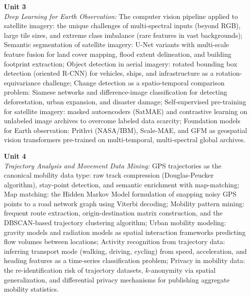 \vspace{0.3cm}

\noindent\textbf{Unit 3} \\
\textit{Deep Learning for Earth Observation:} The computer vision pipeline applied to satellite imagery: the unique challenges of multi-spectral inputs (beyond RGB), large tile sizes, and extreme class imbalance (rare features in vast backgrounds); Semantic segmentation of satellite imagery: U-Net variants with multi-scale feature fusion for land cover mapping, flood extent delineation, and building footprint extraction; Object detection in aerial imagery: rotated bounding box detection (oriented R-CNN) for vehicles, ships, and infrastructure as a rotation-equivariance challenge; Change detection as a spatio-temporal comparison problem: Siamese networks and difference-image classification for detecting deforestation, urban expansion, and disaster damage; Self-supervised pre-training for satellite imagery: masked autoencoders (SatMAE) and contrastive learning on unlabeled image archives to overcome labeled data scarcity; Foundation models for Earth observation: Prithvi (NASA/IBM), Scale-MAE, and GFM as geospatial vision transformers pre-trained on multi-temporal, multi-spectral global archives.

\vspace{0.3cm}

\noindent\textbf{Unit 4} \\
\textit{Trajectory Analysis and Movement Data Mining:} GPS trajectories as the canonical mobility data type: raw track compression (Douglas-Peucker algorithm), stay-point detection, and semantic enrichment with map-matching; Map matching: the Hidden Markov Model formulation of snapping noisy GPS points to a road network graph using Viterbi decoding; Mobility pattern mining: frequent route extraction, origin-destination matrix construction, and the DBSCAN-based trajectory clustering algorithm; Urban mobility modeling: gravity models and radiation models as spatial interaction frameworks predicting flow volumes between locations; Activity recognition from trajectory data: inferring transport mode (walking, driving, cycling) from speed, acceleration, and heading features as a time-series classification problem; Privacy in mobility data: the re-identification risk of trajectory datasets, $k$-anonymity via spatial generalization, and differential privacy mechanisms for publishing aggregate mobility statistics.

\vspace{0.3cm}

